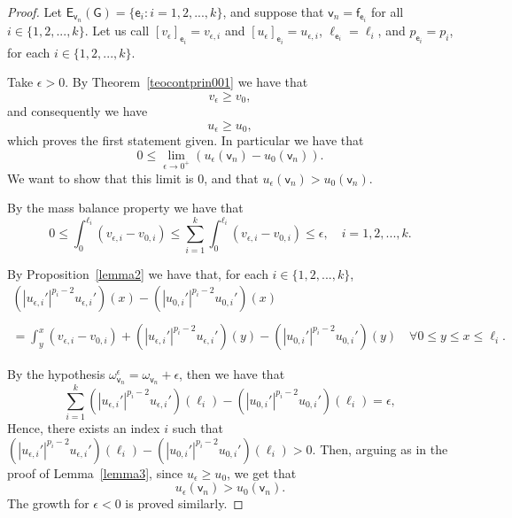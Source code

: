 \documentclass[reqno,12pt]{amsart}
\def\e{\mathsf{e}} 	%
\def\v{\mathsf{v}}	%
\newcommand{\vf}{\mathsf{f}} %
\newcommand{\G}{\mathsf{G}}	%
\newcommand{\E}{\mathsf{E}}	%
\numberwithin{equation}{section} %
\begin{document}
\begin{proof}     
Let $\E_{\v_n}(\G)=\{\e_i:i=1,2,...,k\}$, and suppose that $\v_n=\vf_{\e_i}$ for all $i\in\{1,2,...,k\}$. Let us call $[v_\epsilon]_{\e_i}=v_{\epsilon,i}$ and $[u_\epsilon]_{\e_i}=u_{\epsilon,i}$, $\ell_{\e_i}=\ell_i$,  and $p_{\e_i}=p_i$, for each $i\in\{1,2,...,k\}$. 

Take $\epsilon>0$. By Theorem~\ref{teocontprin001} we have that $$v_\epsilon\ge v_0,$$ and consequently we have 
$$u_\epsilon\ge u_0,$$ which proves the first statement given.
In particular we have that
\begin{equation}\label{nmced001}
   0\le \lim_{\epsilon\to 0^+}\left(u_\epsilon(\v_n)-u_0(\v_n)\right).
\end{equation}
We want to show that this limit is $0$, and that $u_\epsilon(\v_n)> u_0(\v_n).$


By the mass balance property we have that 
\begin{equation}\label{conv0001}
  0\le\int_0^{\ell_i} (v_{\epsilon,i} - v_{0,i})\le
 \sum_{i=1}^k\int_0^{\ell_i} (v_{\epsilon,i} - v_{0,i})\le \epsilon,\quad i=1,2,...,k.
\end{equation}

By Proposition~\ref{lemma2} we have that, for each $i\in\{1,2,...,k\}$,
\begin{equation}\label{conv0002conx}
\begin{array}{c}
\displaystyle
(|u_{\epsilon,i}'|^{p_i-2}u_{\epsilon,i}') (x) -  (|u_{0,i}'|^{p_i-2}u_{0,i}') (x)   
\\ \\
\displaystyle=  \int_y^{x}
(v_{\epsilon,i} - v_{0,i})+  (|u_{\epsilon,i}'|^{p_i-2}u_{\epsilon,i}') (y) -  (|u_{0,i}'|^{p_i-2}u_{0,i}') (y)\quad\forall 0\le y\le x\le\ell_i.
\end{array}
\end{equation}


By the hypothesis $\omega^\epsilon_{\v_n}=\omega_{\v_n}+\epsilon$, then we have that
\begin{equation}\label{100326001}
\sum_{i=1}^k(|u_{\epsilon,i}'|^{p_i-2}u_{\epsilon,i}') (\ell_i) -  (|u_{0,i}'|^{p_i-2}u_{0,i}') (\ell_i)=\epsilon,
\end{equation}
Hence, there exists an index $i$ such that  $(|u_{\epsilon,i}'|^{p_i-2}u_{\epsilon,i}') (\ell_i) -  (|u_{0,i}'|^{p_i-2}u_{0,i}')(\ell_i) >0$.   Then, arguing as in the proof of Lemma~\ref{lemma3}, since $u_\epsilon\ge u_0$, we get that
$$      u_\epsilon(\v_n)> u_0(\v_n).$$
The growth for $\epsilon<0$ is proved similarly.
 

\end{proof}
\end{document}
